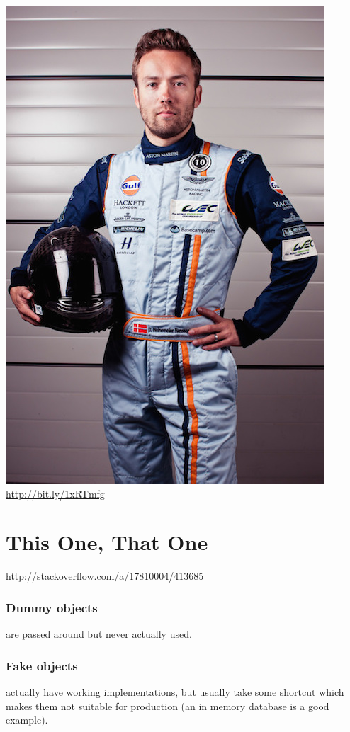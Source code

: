 \documentclass[11pt]{article}
\begin{document}
\includegraphics[width=.9\linewidth]{../images/dhh_go.jpg}
\url{http://bit.ly/1xRTmfg}
\section{This One, That One}
\label{sec-15}

\url{http://stackoverflow.com/a/17810004/413685}
\subsubsection{Dummy objects}
\label{sec-15-0-1}
are passed around but never actually used.
\subsubsection{Fake objects}
\label{sec-15-0-2}
actually have working implementations, but usually take some shortcut
which makes them not suitable for production (an in memory database
is a good example).
\end{document}
